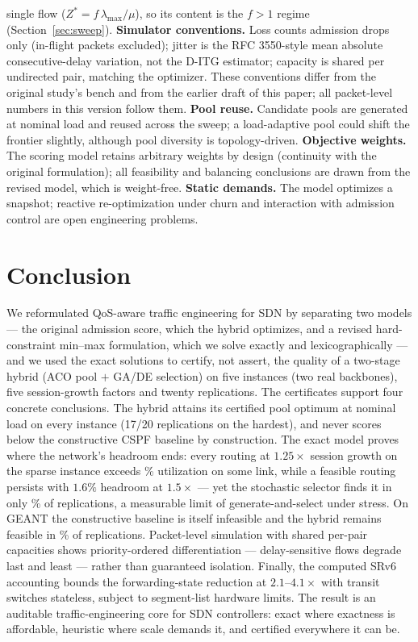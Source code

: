 \documentclass[journal]{IEEEtran}
\begin{document}
single flow ($Z^{*}=f\,\lambda_{\max}/\mu$), so its content is the $f>1$
regime (Section~\ref{sec:sweep}).
\textbf{Simulator conventions.} Loss counts admission drops only (in-flight
packets excluded); jitter is the RFC 3550-style mean absolute
consecutive-delay variation, not the D-ITG estimator; capacity is shared per
undirected pair, matching the optimizer. These conventions differ from the
original study's bench and from the earlier draft of this paper; all
packet-level numbers in this version follow them.
\textbf{Pool reuse.} Candidate pools are generated at nominal load and
reused across the sweep; a load-adaptive pool could shift the frontier
slightly, although pool diversity is topology-driven.
\textbf{Objective weights.} The scoring model retains arbitrary weights by
design (continuity with the original formulation); all feasibility and
balancing conclusions are drawn from the revised model, which is
weight-free.
\textbf{Static demands.} The model optimizes a snapshot; reactive
re-optimization under churn and interaction with admission control are open
engineering problems.

\section{Conclusion}
\label{sec:conc}
We reformulated QoS-aware traffic engineering for SDN by separating two
models --- the original admission score, which the hybrid optimizes, and a
revised hard-constraint min--max formulation, which we solve exactly and
lexicographically --- and we used the exact solutions to certify, not
assert, the quality of a two-stage hybrid (ACO pool $+$ GA/DE selection) on
five instances (two real backbones), five session-growth factors and twenty
replications. The certificates support four concrete conclusions. The hybrid
attains its certified pool optimum at nominal load on every instance
(17/20 replications on the hardest), and never scores below the constructive
CSPF baseline by construction. The exact model proves where the network's
headroom ends: every routing at $1.25\times$ session growth on the sparse
instance exceeds \IlpZmaiaHighPct\% utilization on some link, while a
feasible routing persists with $1.6\%$ headroom at $1.5\times$ --- yet the
stochastic selector finds it in only \GaFeasMaiaMax\% of replications, a
measurable limit of generate-and-select under stress. On GEANT the
constructive baseline is itself infeasible and the hybrid remains feasible
in \AntGaFeas\% of replications. Packet-level simulation with shared
per-pair capacities shows priority-ordered differentiation --- delay-sensitive
flows degrade last and least --- rather than guaranteed isolation. Finally,
the computed SRv6 accounting bounds the forwarding-state reduction at
$2.1$--$4.1\times$ with transit switches stateless, subject to segment-list
hardware limits. The result is an auditable traffic-engineering core for SDN
controllers: exact where exactness is affordable, heuristic where scale
demands it, and certified everywhere it can be.
\end{document}
